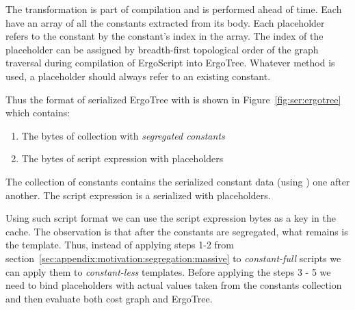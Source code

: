 The transformation is part of compilation and is performed ahead of time.
Each \ASDag have an array of all the constants extracted from its body. Each
placeholder refers to the constant by the constant's index in the array.
The index of the placeholder can be assigned by breadth-first topological
order of the graph traversal during compilation of ErgoScript into ErgoTree. Whatever
method is used, a placeholder should always refer to an existing constant.

Thus the format of serialized ErgoTree with is shown in Figure~\ref{fig:ser:ergotree}
which contains:
\begin{enumerate}
    \item The bytes of collection with \emph{segregated constants}
    \item The bytes of script expression with placeholders
\end{enumerate}

The collection of constants contains the serialized constant data (using
\hyperref[sec:ser:const]{}) one after another. The script
expression is a serialized \hyperref[sec:ser:expr]{} with placeholders.

Using such script format we can use the script expression bytes as a key in the cache.
The observation is that after the constants are segregated, what remains is the
template. Thus, instead of applying steps 1-2 from
section~\ref{sec:appendix:motivation:segregation:massive} to \emph{constant-full}
scripts we can apply them to \emph{constant-less} templates. 
Before applying the steps 3 - 5 we need to bind placeholders with actual values taken
from the constants collection and then evaluate both cost graph and ErgoTree.